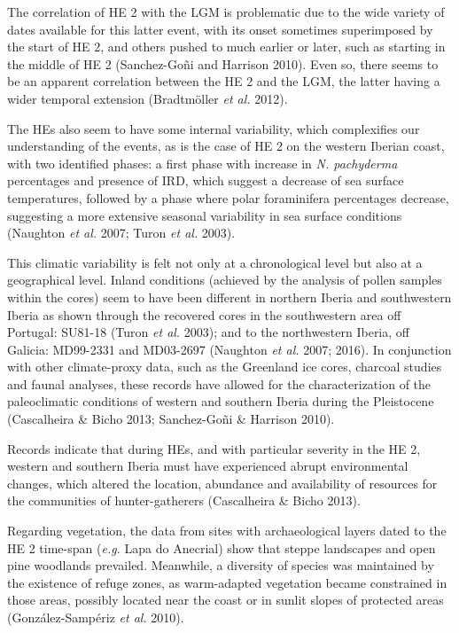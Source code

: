 \documentclass[12pt,twoside]{reedthesis}
\begin{document}
The correlation of HE 2 with the LGM is problematic due to the wide variety of dates available for this latter event, with its onset sometimes superimposed by the start of HE 2, and others pushed to much earlier or later, such as starting in the middle of HE 2 (Sanchez-Goñi and Harrison 2010). Even so, there seems to be an apparent correlation between the HE 2 and the LGM, the latter having a wider temporal extension (Bradtmöller \emph{et al.} 2012).

The HEs also seem to have some internal variability, which complexifies our understanding of the events, as is the case of HE 2 on the western Iberian coast, with two identified phases: a first phase with increase in \emph{N. pachyderma} percentages and presence of IRD, which suggest a decrease of sea surface temperatures, followed by a phase where polar foraminifera percentages decrease, suggesting a more extensive seasonal variability in sea surface conditions (Naughton \emph{et al.} 2007; Turon \emph{et al.} 2003).

This climatic variability is felt not only at a chronological level but also at a geographical level. Inland conditions (achieved by the analysis of pollen samples within the cores) seem to have been different in northern Iberia and southwestern Iberia as shown through the recovered cores in the southwestern area off Portugal: SU81-18 (Turon \emph{et al.} 2003); and to the northwestern Iberia, off Galicia: MD99-2331 and MD03-2697 (Naughton \emph{et al.} 2007; 2016). In conjunction with other climate-proxy data, such as the Greenland ice cores, charcoal studies and faunal analyses, these records have allowed for the characterization of the paleoclimatic conditions of western and southern Iberia during the Pleistocene (Cascalheira \& Bicho 2013; Sanchez-Goñi \& Harrison 2010).

Records indicate that during HEs, and with particular severity in the HE 2, western and southern Iberia must have experienced abrupt environmental changes, which altered the location, abundance and availability of resources for the communities of hunter-gatherers (Cascalheira \& Bicho 2013).

Regarding vegetation, the data from sites with archaeological layers dated to the HE 2 time-span (\emph{e.g.} Lapa do Anecrial) show that steppe landscapes and open pine woodlands prevailed. Meanwhile, a diversity of species was maintained by the existence of refuge zones, as warm-adapted vegetation became constrained in those areas, possibly located near the coast or in sunlit slopes of protected areas (González-Sampériz \emph{et al.} 2010).
\end{document}
